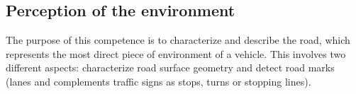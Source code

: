 \documentclass[journal]{IEEEtran}
\begin{document}


\subsection{Perception of the environment}
The purpose of this competence is to characterize and describe the road, which
represents the most direct piece of environment of a vehicle. This 
involves two different aspects: characterize road surface geometry and detect road marks (lanes
and complements traffic signs as stops, turns or stopping lines).


\end{document}
